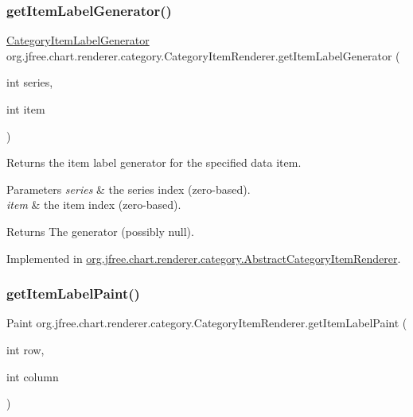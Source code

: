 \subsubsection{\texorpdfstring{get\+Item\+Label\+Generator()}{getItemLabelGenerator()}}
{\footnotesize\ttfamily \mbox{\hyperlink{interfaceorg_1_1jfree_1_1chart_1_1labels_1_1_category_item_label_generator}{Category\+Item\+Label\+Generator}} org.\+jfree.\+chart.\+renderer.\+category.\+Category\+Item\+Renderer.\+get\+Item\+Label\+Generator (\begin{DoxyParamCaption}\item[{int}]{series,  }\item[{int}]{item }\end{DoxyParamCaption})}

Returns the item label generator for the specified data item.


\begin{DoxyParams}{Parameters}
{\em series} & the series index (zero-\/based). \\
\hline
{\em item} & the item index (zero-\/based).\\
\hline
\end{DoxyParams}
\begin{DoxyReturn}{Returns}
The generator (possibly {\ttfamily null}). 
\end{DoxyReturn}


Implemented in \mbox{\hyperlink{classorg_1_1jfree_1_1chart_1_1renderer_1_1category_1_1_abstract_category_item_renderer_ab681e0113f33ce79948caf655729227b}{org.\+jfree.\+chart.\+renderer.\+category.\+Abstract\+Category\+Item\+Renderer}}.

\mbox{\label{interfaceorg_1_1jfree_1_1chart_1_1renderer_1_1category_1_1_category_item_renderer_a6dc09b23062ace26315b23d97263871e}} 
\subsubsection{\texorpdfstring{get\+Item\+Label\+Paint()}{getItemLabelPaint()}\hspace{0.1cm}{\footnotesize\ttfamily [1/2]}}
{\footnotesize\ttfamily Paint org.\+jfree.\+chart.\+renderer.\+category.\+Category\+Item\+Renderer.\+get\+Item\+Label\+Paint (\begin{DoxyParamCaption}\item[{int}]{row,  }\item[{int}]{column }\end{DoxyParamCaption})}

